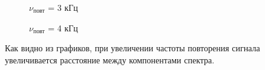 \documentclass[a4paper,12pt]{article}
\begin{document}
\begin{enumerate}
\begin{figure}[h]
\begin{minipage}[h]{0.47\linewidth}
 $\nu_\text{повт}$ = 3 кГц  \\
\end{minipage}
\hfill
\begin{minipage}[h]{0.47\linewidth}
 $\nu_\text{повт}$ = 4 кГц  \\
\end{minipage}
\caption{}
\label{ris:experimentalcorrelationsignals}
\end{figure}


Как видно из графиков, при увеличении частоты повторения сигнала увеличивается расстояние между компонентами спектра.


\end{enumerate}
\end{document}
